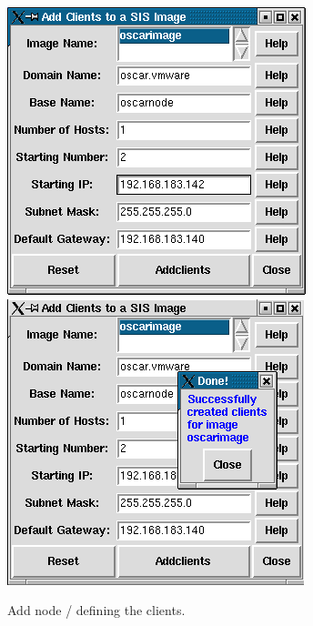 \begin{figure}[!hb]
  \begin{center}
    \centerline{
      \includegraphics[scale=\imgscale]{figs/9b_sbs-add-node-mksirange}
      \hspace{\imghskip}
      \includegraphics[scale=\imgscale]{figs/9c_sbs-add-node-success}
      }
    \caption{Add node / defining the clients.}
    \label{fig:sbs-add-node1-define-clients}
  \end{center}
\end{figure}

